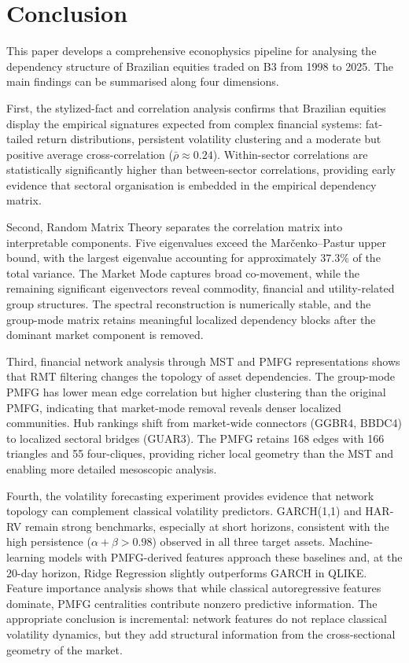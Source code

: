 \section{Conclusion}
\label{sec:conclusion}

This paper develops a comprehensive econophysics pipeline for analysing the dependency structure of Brazilian equities traded on B3 from 1998 to 2025. The main findings can be summarised along four dimensions.

First, the stylized-fact and correlation analysis confirms that Brazilian equities display the empirical signatures expected from complex financial systems: fat-tailed return distributions, persistent volatility clustering and a moderate but positive average cross-correlation ($\bar{\rho} \approx 0.24$). Within-sector correlations are statistically significantly higher than between-sector correlations, providing early evidence that sectoral organisation is embedded in the empirical dependency matrix.

Second, Random Matrix Theory separates the correlation matrix into interpretable components. Five eigenvalues exceed the Mar\v{c}enko--Pastur upper bound, with the largest eigenvalue accounting for approximately $37.3\%$ of the total variance. The Market Mode captures broad co-movement, while the remaining significant eigenvectors reveal commodity, financial and utility-related group structures. The spectral reconstruction is numerically stable, and the group-mode matrix retains meaningful localized dependency blocks after the dominant market component is removed.

Third, financial network analysis through MST and PMFG representations shows that RMT filtering changes the topology of asset dependencies. The group-mode PMFG has lower mean edge correlation but higher clustering than the original PMFG, indicating that market-mode removal reveals denser localized communities. Hub rankings shift from market-wide connectors (GGBR4, BBDC4) to localized sectoral bridges (GUAR3). The PMFG retains 168 edges with 166 triangles and 55 four-cliques, providing richer local geometry than the MST and enabling more detailed mesoscopic analysis.

Fourth, the volatility forecasting experiment provides evidence that network topology can complement classical volatility predictors. GARCH(1,1) and HAR-RV remain strong benchmarks, especially at short horizons, consistent with the high persistence ($\alpha + \beta > 0.98$) observed in all three target assets. Machine-learning models with PMFG-derived features approach these baselines and, at the 20-day horizon, Ridge Regression slightly outperforms GARCH in QLIKE. Feature importance analysis shows that while classical autoregressive features dominate, PMFG centralities contribute nonzero predictive information. The appropriate conclusion is incremental: network features do not replace classical volatility dynamics, but they add structural information from the cross-sectional geometry of the market.

